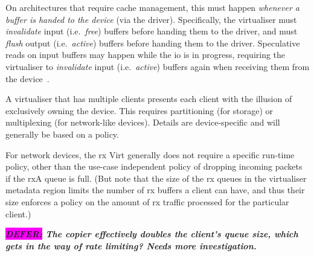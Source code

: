 \documentclass[a4paper,12pt]{report}
\newcommand{\Comment}[1]{\textbf{\textsl{#1}}}
\newcommand{\DEFER}[1]{\textbf{\textsl{\colorbox{magenta}{DEFER:} #1}}}
\newcommand{\Comment}[1]{\relax}
\newcommand{\DEFER}[1]{\relax}
\newcommand{\courtney}[1]{\Comment{#1 \colorbox{pink}{[Courtney]}}}
\begin{document}
On architectures that require cache management, this must happen \emph{whenever
a buffer is handed to the device} (via the driver).
Specifically, the virtualiser must \emph{invalidate} input
(i.e.\ \emph{free}) buffers before handing them to the
driver, and must \emph{flush} output (i.e.\
\emph{active}) buffers before handing them to the driver. Speculative
reads on input buffers may happen while the \gls{io} is in progress,
requiring the virtualiser to \emph{invalidate} input (i.e.\
\emph{active}) buffers again when receiving them from the
device~\citep[p.~33]{Rutland_16}.

A virtualiser that has multiple clients presents each client with the
illusion of exclusively owning the device. This requires partitioning
(for storage) or multiplexing (for network-like devices). Details are
device-specific and will generally be based on a policy.

For network devices, the \gls{rx} Virt generally does not require a specific
run-time policy, other than the use-case independent policy of
dropping incoming packets if the \gls{rx}A queue is full. (But note that the
size of the \gls{rx} queues in the virtualiser metadata region limits the
number of \gls{rx} buffers a client can have, and thus their size enforces a
policy on the amount of \gls{rx} traffic processed for the particular
client.)

\DEFER{The copier effectively doubles the client's queue size, which
  gets in the way of rate limiting? Needs more investigation.}

\end{document}
